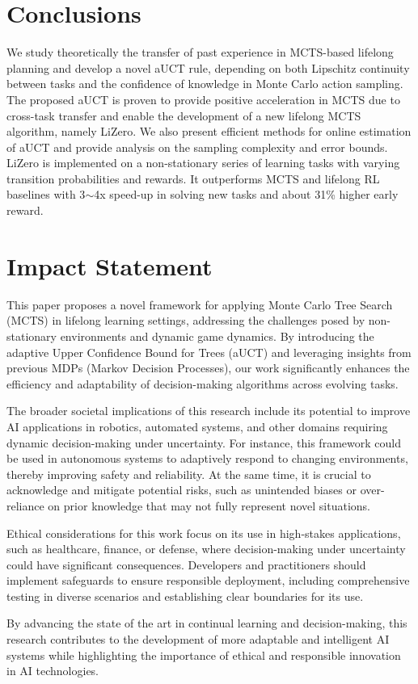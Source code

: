 \section{Conclusions}

We study theoretically the transfer of past experience in MCTS-based lifelong planning and develop a novel aUCT rule, depending on both Lipschitz continuity between tasks and the confidence of knowledge in Monte Carlo action sampling. The proposed aUCT is proven to provide positive acceleration in MCTS due to cross-task transfer and enable the development of a new lifelong MCTS algorithm, namely LiZero. We also present efficient methods for online estimation of aUCT and provide analysis on the sampling complexity and error bounds. LiZero is implemented on a non-stationary series of learning tasks with varying transition probabilities and rewards. It outperforms MCTS and lifelong RL baselines with 3$\sim$4x speed-up in solving
new tasks and about 31\% higher early reward.



\section*{Impact Statement}
This paper proposes a novel framework for applying Monte Carlo Tree Search (MCTS) in lifelong learning settings, addressing the challenges posed by non-stationary environments and dynamic game dynamics. By introducing the adaptive Upper Confidence Bound for Trees (aUCT) and leveraging insights from previous MDPs (Markov Decision Processes), our work significantly enhances the efficiency and adaptability of decision-making algorithms across evolving tasks.

The broader societal implications of this research include its potential to improve AI applications in robotics, automated systems, and other domains requiring dynamic decision-making under uncertainty. For instance, this framework could be used in autonomous systems to adaptively respond to changing environments, thereby improving safety and reliability. At the same time, it is crucial to acknowledge and mitigate potential risks, such as unintended biases or over-reliance on prior knowledge that may not fully represent novel situations.

Ethical considerations for this work focus on its use in high-stakes applications, such as healthcare, finance, or defense, where decision-making under uncertainty could have significant consequences. Developers and practitioners should implement safeguards to ensure responsible deployment, including comprehensive testing in diverse scenarios and establishing clear boundaries for its use.

By advancing the state of the art in continual learning and decision-making, this research contributes to the development of more adaptable and intelligent AI systems while highlighting the importance of ethical and responsible innovation in AI technologies.

\nocite{langley00}